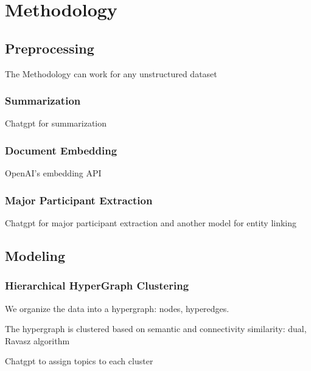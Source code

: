 \section{Methodology}
\subsection{Preprocessing}
The Methodology can work for any unstructured dataset
\subsubsection{Summarization}
Chatgpt for summarization
\subsubsection{Document Embedding}
OpenAI's embedding API
\subsubsection{Major Participant Extraction}
Chatgpt for major participant extraction and another model for entity linking

\subsection{Modeling}
\subsubsection{Hierarchical HyperGraph Clustering}
We organize the data into a hypergraph: nodes, hyperedges.

The hypergraph is clustered based on semantic and connectivity similarity: dual, Ravasz algorithm

Chatgpt to assign topics to each cluster